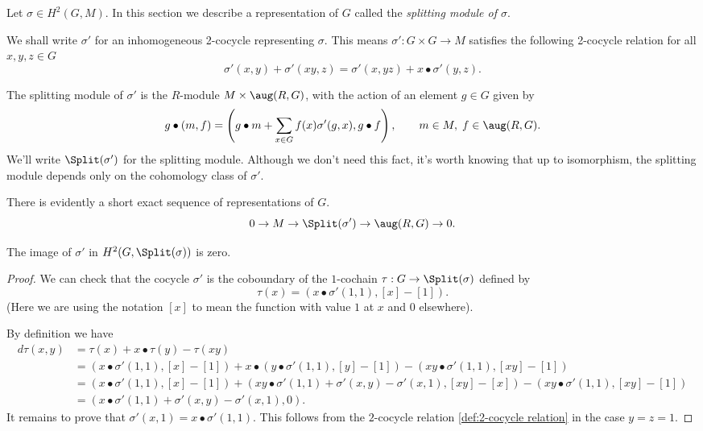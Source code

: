 Let $\sigma \in H^2(G,M)$.
In this section we describe a representation of $G$ called the \emph{splitting module of $\sigma$}.

We shall write $\sigma'$ for an inhomogeneous 2-cocycle representing $\sigma$.
This means $\sigma' : G \times G \to M$ satisfies the following 2-cocycle
relation for all $x,y,z\in G$
\begin{equation} \label{def:2-cocycle relation}
	\sigma'(x,y) + \sigma'(xy,z) = \sigma'(x,yz) + x \bullet \sigma'(y,z).
\end{equation}


\begin{definition} \label{def:splitting module}
	The splitting module of $\sigma'$ is the $R$-module $M \times \aug(R,G)$,
	with the action of an element $g \in G$ given by
	\[
		g \bullet (m,f)
		= \left(g \bullet m + \sum_{x \in G} f(x) \sigma'(g,x) , g \bullet f\right),
		\qquad m \in M, \; f \in \aug(R,G).
	\]
	We'll write $\Split(\sigma')$ for the splitting module.
	Although we don't need this fact, it's worth knowing that up to isomorphism,
	the splitting module depends only on the cohomology class of $\sigma'$.
\end{definition}

There is evidently a short exact sequence of representations of $G$.
\begin{equation}\label{eq:split ses}
	0 \to M \to \Split(\sigma') \to \aug(R,G) \to 0.
\end{equation}

\begin{lemma} \label{lem:splits in splitting module}
	The image of $\sigma'$ in $H^2(G,\Split(\sigma))$ is zero.
\end{lemma}

\begin{proof}
	We can check that the cocycle $\sigma'$ is the coboundary of
	the $1$-cochain $\tau : G \to \Split(\sigma)$ defined by
	\[
		\tau (x) = (x \bullet σ'(1,1), [x]-[1]).
	\]
	(Here we are using the notation $[x]$
	to mean the function with value $1$ at $x$ and $0$ elsewhere).

	By definition we have
	\begin{align*}
		d\tau (x,y)
		&= \tau(x) + x \bullet \tau(y) - \tau(xy) \\
		&= (x \bullet σ'(1,1), [x]-[1])
		+ x \bullet (y \bullet σ'(1,1), [y]-[1])
		-(xy \bullet σ'(1,1), [xy]-[1])\\
		&=
		(x \bullet σ'(1,1), [x]-[1])
		+ (xy \bullet σ'(1,1) + \sigma'(x,y) -\sigma'(x,1), [xy]-[x])
		- (xy \bullet σ'(1,1), [xy]-[1])\\
		&=
		(x \bullet \sigma'(1,1) + \sigma'(x,y) -\sigma'(x,1) , 0).
	\end{align*}
	It remains to prove that $\sigma'(x,1) = x \bullet \sigma'(1,1)$.
	This follows from the $2$-cocycle relation \ref{def:2-cocycle relation}	in the case $y=z=1$.
\end{proof}





